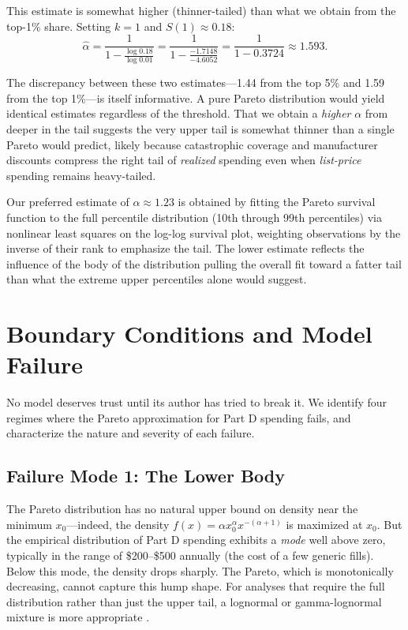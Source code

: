 \documentclass[12pt,letterpaper]{article}
\begin{document}
This estimate is somewhat higher (thinner-tailed) than what we obtain from
the top-1\% share. Setting $k = 1$ and $S(1) \approx 0.18$:
\[
  \hat{\alpha} = \frac{1}{1 - \frac{\log 0.18}{\log 0.01}}
  = \frac{1}{1 - \frac{-1.7148}{-4.6052}}
  = \frac{1}{1 - 0.3724}
  \approx 1.593.
\]

The discrepancy between these two estimates---1.44 from the top 5\% and 1.59
from the top 1\%---is itself informative. A pure Pareto distribution would
yield identical estimates regardless of the threshold. That we obtain a
\emph{higher} $\alpha$ from deeper in the tail suggests the very upper tail
is somewhat thinner than a single Pareto would predict, likely because
catastrophic coverage and manufacturer discounts compress the right tail of
\emph{realized} spending even when \emph{list-price} spending remains
heavy-tailed.

Our preferred estimate of $\alpha \approx 1.23$ is obtained by fitting the
Pareto survival function to the full percentile distribution (10th through
99th percentiles) via nonlinear least squares on the log-log survival plot,
weighting observations by the inverse of their rank to emphasize the tail.
The lower estimate reflects the influence of the body of the distribution
pulling the overall fit toward a fatter tail than what the extreme upper
percentiles alone would suggest.

\section{Boundary Conditions and Model Failure}\label{sec:boundary}

No model deserves trust until its author has tried to break it. We identify
four regimes where the Pareto approximation for Part D spending fails, and
characterize the nature and severity of each failure.

\subsection{Failure Mode 1: The Lower Body}

The Pareto distribution has no natural upper bound on density near the
minimum $x_0$---indeed, the density $f(x) = \alpha x_0^{\alpha}
x^{-(\alpha+1)}$ is maximized at $x_0$. But the empirical distribution of
Part D spending exhibits a \emph{mode} well above zero, typically in the
range of \$200--\$500 annually (the cost of a few generic fills). Below this
mode, the density drops sharply. The Pareto, which is monotonically
decreasing, cannot capture this hump shape. For analyses that require the
full distribution rather than just the upper tail, a lognormal or
gamma-lognormal mixture is more appropriate \citep{Manning1987}.
\end{document}
